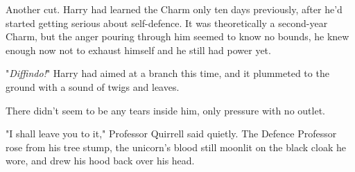 Another cut. Harry had learned the Charm only ten days previously, after he'd
started getting serious about self-defence. It was theoretically a second-year
Charm, but the anger pouring through him seemed to know no bounds, he knew
enough now not to exhaust himself and he still had power yet.

"\emph{Diffindo!}" Harry had aimed at a branch this time, and it plummeted to
the ground with a sound of twigs and leaves.

There didn't seem to be any tears inside him, only pressure with no outlet.

"I shall leave you to it," Professor Quirrell said quietly. The Defence
Professor rose from his tree stump, the unicorn's blood still moonlit on the
black cloak he wore, and drew his hood back over his head.
